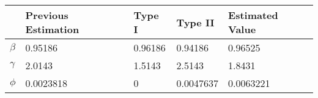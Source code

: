 \begin{tabular}{lllll}
& Previous Estimation & Type I & Type II & Estimated Value \\ 
\hline 
$\beta$ & 0.95186 & 0.96186 & 0.94186 & 0.96525 \\ 
$\gamma$ & 2.0143 & 1.5143 & 2.5143 & 1.8431 \\ 
$\phi$ & 0.0023818 & 0 & 0.0047637 & 0.0063221 \\ 
\hline 
\end{tabular}